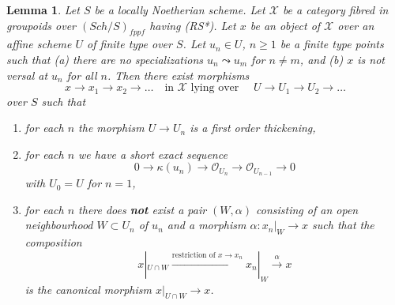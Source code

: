 \documentclass[10pt,a4paper]{amsart}
\theoremstyle{plain}
\newtheorem{lemma}[subsection]{Lemma}
\theoremstyle{definition}
\theoremstyle{remark}
\numberwithin{equation}{subsection}
\def\Sch{\mathit{Sch}}
\begin{document}
\begin{lemma}
\label{lemma-infinite-sequence-pre}
Let $S$ be a locally Noetherian scheme. Let $\mathcal{X}$ be a category
fibred in groupoids over $(\Sch/S)_{fppf}$ having (RS*).
Let $x$ be an object of
$\mathcal{X}$ over an affine scheme $U$ of finite type over $S$.
Let $u_n \in U$, $n \geq 1$ be a finite type points such that
(a) there are no specializations $u_n \leadsto u_m$ for $n \not = m$, and
(b) $x$ is not versal at $u_n$ for all $n$. Then there exist morphisms
$$
x \to x_1 \to x_2 \to \ldots
\quad\text{in }\mathcal{X}\text{ lying over }\quad
U \to U_1 \to U_2 \to \ldots
$$
over $S$ such that
\begin{enumerate}
\item for each $n$ the morphism $U \to U_n$ is a first order
thickening,
\item for each $n$ we have a short exact sequence
$$
0 \to \kappa(u_n) \to \mathcal{O}_{U_n} \to \mathcal{O}_{U_{n - 1}} \to 0
$$
with $U_0 = U$ for $n = 1$,
\item for each $n$ there does {\bf not} exist a pair $(W, \alpha)$
consisting of an open neighbourhood $W \subset U_n$ of $u_n$
and a morphism $\alpha : x_n|_W \to x$
such that the composition
$$
x|_{U \cap W} \xrightarrow{\text{restriction of }x \to x_n}
x_n|_W \xrightarrow{\alpha} x
$$
is the canonical morphism $x|_{U \cap W} \to x$.
\end{enumerate}
\end{lemma}
\end{document}
